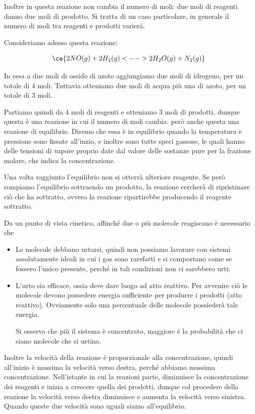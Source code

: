 Inoltre in questa reazione non cambia il numero di moli: due moli di reagenti danno due moli di prodotto. Si tratta di un caso particolare, in generale il numero di moli tra reagenti e prodotti varierà.

\vspace{0.2cm}Consideriamo adesso questa reazione:

$$\ce{2NO(g) + 2H_2(g) <--> 2H_2O(g) + N_2(g)}$$

In essa a due moli di ossido di azoto aggiungiamo due moli di idrogeno, per un totale di 4 moli. Tuttavia otteniamo due moli di acqua più una di azoto, per un totale di 3 moli.

Partiamo quindi da 4 moli di reagenti e otteniamo 3 moli di prodotti, dunque questa è una reazione in cui il numero di moli cambia. \E però anche questa una reazione di equilibrio. Diremo che essa è in equilibrio quando la temperatura e pressione sono fissate all'inzio, e inoltre sono tutte speci gassose, le quali hanno delle tensioni di vapore proprio date dal valore delle sostanze pure per la frazione molare, che indica la concentrazione.

Una volta raggiunto l'equilibrio non si otterrà ulteriore reagente. Se però rompiamo l'equilibrio sottraendo un prodotto, la reazione cercherà di ripristinare ciò che ha sottratto, ovvero la reazione ripartirebbe producendo il reagente sottratto.

\vspace{0.2cm}Da un punto di vista cinetico, affinché due o più molecole reagiscano è necessario che

\begin{itemize}
    \item Le molecole debbano urtarsi, quindi non possiamo lavorare con sistemi assolutamente ideali in cui i gas sono rarefatti e si comportano come se fossero l'unico presente, perché in tali condizioni non ci sarebbero urti;
    \item L'urto sia efficace, ossia deve dare luogo ad atto reattivo. Per avvenire ciò le molecole devono possedere energia sufficiente per produrre i prodotti (atto reattivo). Ovviamente solo una percentuale delle molecole possiederà tale energia.

    Si osserva che più il sistema è concentrato, maggiore è la probabilità che ci siano molecole che si urtino.
\end{itemize}

Inoltre la velocità della reazione è proporzionale alla concentrazione, quindi all'inizio è massima la velocità verso destra, perché abbiamo massima concentrazione. Nell'istante in cui la reazioni parte, diminuisce la concentrazione dei reagenti e inizia a crescere quella dei prodotti, dunque col procedere della reazione la velocità verso destra diminuisce e aumenta la velocità verso sinistra. Quando queste due velocità sono uguali siamo all'equilibrio.
